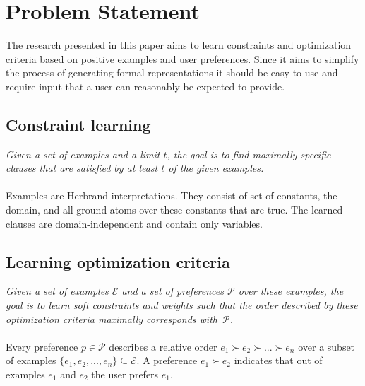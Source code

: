\documentclass[letterpaper]{article}
\newcommand{\sym}[1]{\ensuremath{\mathcal{#1}}}
\theoremstyle{definition}
\newtheorem{example}{Example}
\begin{document}

\section{Problem Statement}
The research presented in this paper aims to learn constraints and optimization criteria based on positive examples and user preferences.
Since it aims to simplify the process of generating formal representations it should be easy to use and require input that a user can reasonably be expected to provide.

\subsection{Constraint learning}
\emph{Given a set of examples and a limit $t$, the goal is to find maximally specific clauses that are satisfied by at least $t$ of the given examples.}
\\\\
Examples are Herbrand interpretations.
They consist of set of constants, the domain, and all ground atoms over these constants that are true.
The learned clauses are domain-independent and contain only variables.



\subsection{Learning optimization criteria}
\emph{Given a set of examples \sym{E} and a set of preferences \sym{P} over these examples, the goal is to learn soft constraints and weights such that the order described by these optimization criteria maximally corresponds with~\sym{P}.}
\\\\
Every preference $p \in \sym{P}$ describes a relative order $e_1 \succ e_2 \succ ... \succ e_n$ over a subset of examples $\{e_1, e_2, ..., e_n\} \subseteq \sym{E}$.
A preference $e_1 \succ e_2$ indicates that out of examples $e_1$ and $e_2$ the user prefers $e_1$.
\end{document}
